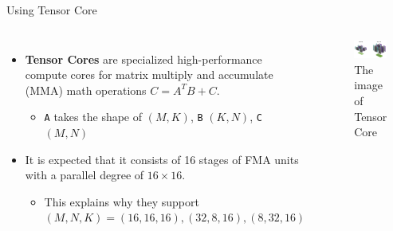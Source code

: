 \documentclass[dvipdfmx, 11pt, aspectratio=169]{beamer}   %
\begin{document}
\begin{frame}[fragile]{Using Tensor Core}
\begin{columns}
\begin{itemize}
  \item \textbf{Tensor Cores} are specialized high-performance compute cores for matrix multiply and accumulate (MMA) math operations $C=A^TB+C$.
  \begin{itemize}
    \item \lstinline|A| takes the shape of $(M,K)$, \lstinline|B| $(K,N)$, \lstinline|C| $(M,N)$
  \end{itemize}
  \item It is expected that it consists of 16 stages of FMA units with a parallel degree of $16\times16$.
  \begin{itemize}
    \item This explains why they support $(M,N,K)=(16,16,16), (32,8,16), (8,32,16)$
  \end{itemize}
\end{itemize}
\begin{figure}
  \includegraphics[scale=0.3]{img/FP16TensorCore.png}
  \caption{The image of Tensor Core}
\end{figure}
\end{columns}
\end{frame}
\end{document}
